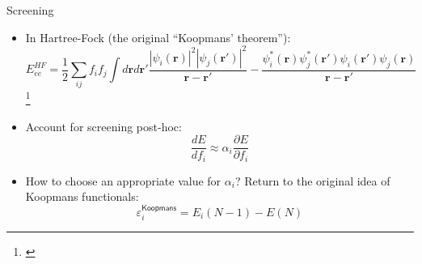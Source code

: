 \documentclass[xcolor=table,aspectratio=169]{beamer}
\newcommand\blfootcite[1]{%
  \begingroup
  \renewcommand\thefootnote{}\footnote{\hspace{-4ex}\cite{#1}}%
  \addtocounter{footnote}{-1}%
  \endgroup
}
\numberwithin{equation}{section}
\begin{document}
\begin{frame}{Screening}
   \small
   \begin{itemize}[<+->]
      \item In Hartree-Fock (the original ``Koopmans' theorem''):
            \begin{equation*}
               E^{HF}_{ee} = \frac{1}{2}\sum_{ij} f_i f_j \int d\mathbf{r} d\mathbf{r}' \frac{|\psi_i(\mathbf{r})|^2|\psi_j(\mathbf{r'})|^2}{\mathbf{r} - \mathbf{r}'} - \frac{\psi_i^*(\mathbf{r})\psi_j^*(\mathbf{r'})\psi_i(\mathbf{r'})\psi_j(\mathbf{r})}{\mathbf{r} - \mathbf{r}'}
            \end{equation*}
            \blfootcite{Li2017}
      \item Account for screening post-hoc:
            \begin{equation*}
               \frac{d E}{d f_i}
               \approx
               \alpha_i
               \frac{\partial E}{\partial f_i}
            \end{equation*}
      \item How to choose an appropriate value for $\alpha_i$? Return to the original idea of Koopmans functionals:
            \begin{equation*}
               \varepsilon_i^\mathsf{Koopmans} = E_i(N-1) - E(N)
            \end{equation*}
   \end{itemize}

\end{frame}
\end{document}
